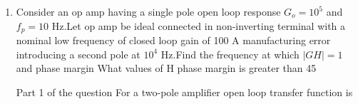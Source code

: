 \begin{enumerate}[label=\thesubsection.\arabic*.,ref=\thesubsection.\theenumi]

\item Consider an op amp having a single pole open loop response $G_{o} = 10^5$ and $f_{p} = 10$ Hz.Let op amp be ideal connected in non-inverting terminal with a nominal low frequency of closed loop gain of 100 
\subitem A manufacturing error introducing a second pole at $10^4$ Hz.Find the frequency at which $|GH| = 1$ and phase margin
\subitem What values of H phase margin is greater than 45\degree

\begin{figure}[ht!]
	\begin{center}
		\resizebox{\columnwidth/1}{!}{}
	\end{center}
	\caption{}
	\label{fig:ee18btech11034_fig}
\end{figure}

\solution Part 1 of the question
For a two-pole amplifier open loop transfer function is 


\end{enumerate}
